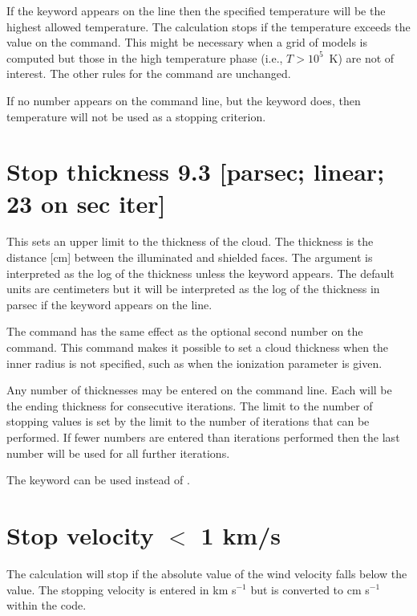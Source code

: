 If the keyword  appears on the line
then the specified temperature
will be the highest allowed temperature.
The calculation stops if the
temperature exceeds the value on the command.
This might be necessary when
a grid of models is computed but those in the high
temperature phase (i.e.,
$T > 10^5$~K) are not of interest.
The other rules for the command are
unchanged.

If no number appears on the command line,
but the keyword  does,
then temperature will not be used as a stopping criterion.

\section{Stop thickness 9.3 [parsec; linear; 23 on sec iter] }
\label{sec:CommandStopThckness}

This sets an upper limit to the thickness of the cloud.
The thickness is the distance [cm] between the illuminated
and shielded faces.
The argument
is interpreted as the log of the thickness unless the keyword
 appears.
The default units are centimeters but it will be interpreted
as the log
of the thickness in parsec if the keyword 
appears on the line.

The  command has the same effect
as the optional second
number on the  command.
This command makes
it possible to set a cloud thickness when the inner radius
is not specified,
such as when the ionization parameter is given.

Any number of thicknesses may be entered on the command line.
Each will
be the ending thickness for consecutive iterations.
The limit to the number
of stopping values is set by the limit to the number of iterations that
can be performed.
If fewer numbers are entered than iterations performed
then the last number will be used for all further iterations.

The keyword  can be used instead of .

\section{Stop velocity $<$ 1 km/s}

The calculation will stop if the absolute value of the wind velocity
falls below the value.
The stopping velocity is entered in km s$^{-1}$ but is
converted to cm s$^{-1}$ within the code.


